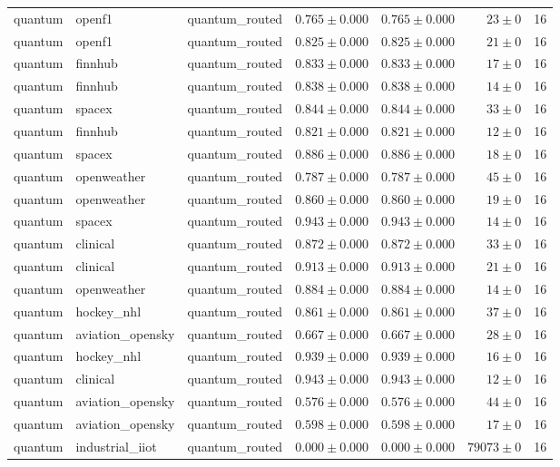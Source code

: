 \begin{table}[htbp]
\begin{tabular}{l l l r r r r}
quantum & openf1 & quantum\_routed & $0.765\pm0.000$ & $0.765\pm0.000$ & $23\pm0$ & 16 \\
quantum & openf1 & quantum\_routed & $0.825\pm0.000$ & $0.825\pm0.000$ & $21\pm0$ & 16 \\
quantum & finnhub & quantum\_routed & $0.833\pm0.000$ & $0.833\pm0.000$ & $17\pm0$ & 16 \\
quantum & finnhub & quantum\_routed & $0.838\pm0.000$ & $0.838\pm0.000$ & $14\pm0$ & 16 \\
quantum & spacex & quantum\_routed & $0.844\pm0.000$ & $0.844\pm0.000$ & $33\pm0$ & 16 \\
quantum & finnhub & quantum\_routed & $0.821\pm0.000$ & $0.821\pm0.000$ & $12\pm0$ & 16 \\
quantum & spacex & quantum\_routed & $0.886\pm0.000$ & $0.886\pm0.000$ & $18\pm0$ & 16 \\
quantum & openweather & quantum\_routed & $0.787\pm0.000$ & $0.787\pm0.000$ & $45\pm0$ & 16 \\
quantum & openweather & quantum\_routed & $0.860\pm0.000$ & $0.860\pm0.000$ & $19\pm0$ & 16 \\
quantum & spacex & quantum\_routed & $0.943\pm0.000$ & $0.943\pm0.000$ & $14\pm0$ & 16 \\
quantum & clinical & quantum\_routed & $0.872\pm0.000$ & $0.872\pm0.000$ & $33\pm0$ & 16 \\
quantum & clinical & quantum\_routed & $0.913\pm0.000$ & $0.913\pm0.000$ & $21\pm0$ & 16 \\
quantum & openweather & quantum\_routed & $0.884\pm0.000$ & $0.884\pm0.000$ & $14\pm0$ & 16 \\
quantum & hockey\_nhl & quantum\_routed & $0.861\pm0.000$ & $0.861\pm0.000$ & $37\pm0$ & 16 \\
quantum & aviation\_opensky & quantum\_routed & $0.667\pm0.000$ & $0.667\pm0.000$ & $28\pm0$ & 16 \\
quantum & hockey\_nhl & quantum\_routed & $0.939\pm0.000$ & $0.939\pm0.000$ & $16\pm0$ & 16 \\
quantum & clinical & quantum\_routed & $0.943\pm0.000$ & $0.943\pm0.000$ & $12\pm0$ & 16 \\
quantum & aviation\_opensky & quantum\_routed & $0.576\pm0.000$ & $0.576\pm0.000$ & $44\pm0$ & 16 \\
quantum & aviation\_opensky & quantum\_routed & $0.598\pm0.000$ & $0.598\pm0.000$ & $17\pm0$ & 16 \\
quantum & industrial\_iiot & quantum\_routed & $0.000\pm0.000$ & $0.000\pm0.000$ & $79073\pm0$ & 16 \\

\end{tabular}
\end{table}
